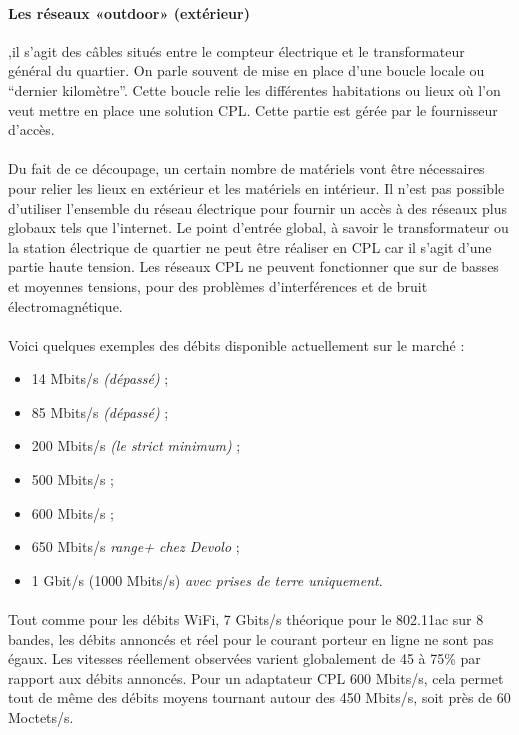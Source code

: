             \paragraph{Les réseaux «outdoor» (extérieur)}
,il s'agit des câbles situés entre le compteur électrique et le transformateur général du quartier.
On parle souvent de mise en place d’une boucle locale ou “dernier kilomètre”.
Cette boucle relie les différentes habitations ou lieux où l'on veut mettre en place une solution CPL.
Cette partie est gérée par le fournisseur d'accès.
            \paragraph{}
Du fait de ce découpage, un certain nombre de matériels vont être nécessaires pour relier les lieux en extérieur et les matériels en intérieur.
Il n'est pas possible d'utiliser l'ensemble du réseau électrique pour fournir un accès à des réseaux plus globaux tels que l’internet.
Le point d'entrée global, à savoir le transformateur ou la station électrique de quartier ne peut être réaliser en CPL car il s'agit d'une partie haute tension.
Les réseaux CPL ne peuvent fonctionner que sur de basses et moyennes tensions, pour des problèmes d'interférences et de bruit électromagnétique.
            \paragraph{}
Voici quelques exemples des débits disponible actuellement sur le marché :
                \begin{itemize}
                    \item 14 Mbits/s \emph{(dépassé)} ;
                    \item 85 Mbits/s \emph{(dépassé)} ;
                    \item 200 Mbits/s \emph{(le strict minimum)} ;
                    \item 500 Mbits/s ;
                    \item 600 Mbits/s ;
                    \item 650 Mbits/s \emph{range+ chez Devolo} ;
                    \item 1 Gbit/s (1000 Mbits/s) \emph{avec prises de terre uniquement}.
                \end{itemize}
            \paragraph{}
Tout comme pour les débits WiFi, 7 Gbits/s théorique pour le 802.11ac sur 8 bandes,
les débits annoncés et réel pour le courant porteur en ligne ne sont pas égaux.
Les vitesses réellement observées varient globalement de 45 à 75\% par rapport aux débits annoncés.
Pour un adaptateur CPL 600 Mbits/s, cela permet tout de même des débits moyens tournant autour des 450 Mbits/s, soit près de 60 Moctets/s.


